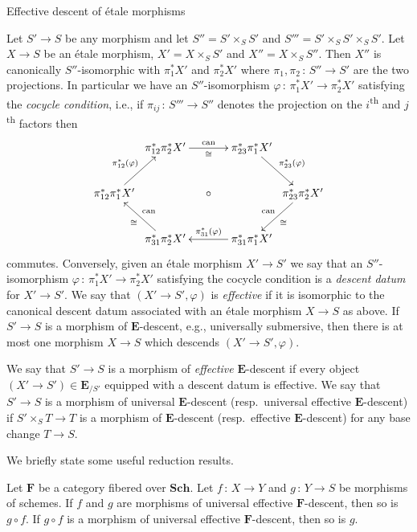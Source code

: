 \documentclass[a4paper,twoside,11pt]{amsart}[2009/07/02] %
\newcommand{\iso}{\cong} %
\newcommand{\map}[3]{#1\,:\, #2\rightarrow #3}
\newcommand{\etale}{\'{e}tale}
\newcommand{\Sch}{\mathbf{Sch}} %
\newcommand{\catE}{\mathbf{E}}
\newcommand{\catF}{\mathbf{F}}
\begin{document}
\begin{section}{Effective descent of \etale{} morphisms}
\begin{xpar}
Let $S'\to S$ be any morphism and let $S''=S'\times_S S'$ and $S'''=S'\times_S
S'\times_S S'$. Let $X\to S$ be an \etale{} morphism, $X'=X\times_S S'$ and
$X''=X\times_S S''$. Then $X''$ is canonically $S''$-isomorphic with
$\pi_1^{*}X'$ and $\pi_2^{*}X'$ where $\map{\pi_1,\pi_2}{S''}{S'}$ are the two
projections. In particular we have an $S''$-isomorphism
$\map{\varphi}{\pi_1^{*}X'}{\pi_2^{*}X'}$ satisfying the \emph{cocycle
condition}, i.e., if $\map{\pi_{ij}}{S'''}{S''}$ denotes the projection on the
$i$\textsuperscript{th} and $j$\textsuperscript{th} factors then
%
\newcommand{\can}{\mathrm{can}}
$$\xymatrix@C=1mm@R=8.6mm{%
& \pi_{12}^{*}\pi_2^{*}X'\ar[rrrr]^{\can}_{\iso}
&&&& \pi_{23}^{*}\pi_1^{*}X'\ar[dr]^{\pi_{23}^*(\varphi)} & \\
\pi_{12}^{*}\pi_1^{*}X'\ar[ur]^{\pi_{12}^*(\varphi)}
&&&\circ&&& \pi_{23}^{*}\pi_2^{*}X'\ar[dl]_{\can}^{\iso} \\
& \pi_{31}^{*}\pi_2^{*}X'\ar[ul]_{\can}^{\iso}
&&&& \pi_{31}^{*}\pi_1^{*}X'\ar[llll]_{\pi_{31}^*(\varphi)} &
}$$
%
commutes.
%
Conversely, given an \etale{} morphism $X'\to S'$ we say that an
$S''$-isomorphism $\map{\varphi}{\pi_1^{*}X'}{\pi_2^{*}X'}$ satisfying the
cocycle condition is a \emph{descent datum} for $X'\to
S'$. We say that $(X'\to S',\varphi)$ is \emph{effective} if it is isomorphic
to the canonical descent datum associated with an \etale{} morphism $X\to S$ as
above. If $S'\to S$ is a morphism of $\catE$-descent, e.g., universally
submersive, then there is at most one morphism $X\to S$ which descends $(X'\to
S',\varphi)$.

We say that $S'\to S$ is a morphism of \emph{effective} $\catE$-descent if
every object $(X'\to S')\in \catE_{/S'}$ equipped with a descent datum is
effective. We say that $S'\to S$ is a morphism of universal $\catE$-descent
(resp.\ universal effective $\catE$-descent) if $S'\times_S T\to T$ is a
morphism of $\catE$-descent (resp.\ effective $\catE$-descent) for any base
change $T\to S$.
\end{xpar}

We briefly state some useful reduction results.

\begin{proposition}
\label{P:giraud-composition}
Let $\catF$ be a category fibered over $\Sch$. Let $\map{f}{X}{Y}$ and
$\map{g}{Y}{S}$ be morphisms of schemes. If $f$ and $g$ are morphisms of
universal effective $\catF$-descent, then so is $g\circ f$. If $g\circ f$ is a
morphism of universal effective $\catF$-descent, then so is $g$.
\end{proposition}


\end{section}
\end{document}
